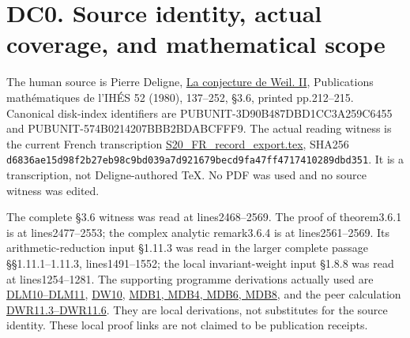 \documentclass[
]{report}
\begin{document}
\section{DC0. Source identity, actual coverage, and mathematical
scope}\label{dc0.-source-identity-actual-coverage-and-mathematical-scope}

The human source is Pierre Deligne,
\href{https://www.numdam.org/item/PMIHES_1980__52__137_0/}{La conjecture
de Weil. II}, Publications mathématiques de l'IHÉS 52 (1980), 137--252,
§3.6, printed pp.212--215. Canonical disk-index identifiers are
PUBUNIT-3D90B487DBD1CC3A259C6455 and PUBUNIT-574B0214207BBB2BDABCFFF9.
The actual reading witness is the current French transcription
\href{https://www.numdam.org/item/PMIHES_1980__52__137_0/}{S20\_FR\_record\_export.tex},
SHA256
\nolinkurl{d6836ae15d98f2b27eb98c9bd039a7d921679becd9fa47ff4717410289dbd351}.
It is a transcription, not Deligne-authored TeX. No PDF was used and no
source witness was edited.

The complete §3.6 witness was read at lines2468--2569. The proof of
theorem3.6.1 is at lines2477--2553; the complex analytic remark3.6.4 is
at lines2561--2569. Its arithmetic-reduction input §1.11.3 was read in
the larger complete passage §§1.11.1--1.11.3, lines1491--1552; the local
invariant-weight input §1.8.8 was read at lines1254--1281. The
supporting programme derivations actually used are
\href{https://github.com/KokunoYumeto/zeta-function-research-reader/blob/main/workbenches/splitzero-tandem/continuations/20260924-cohomology-weight-and-character-lifts/gct-weight-control/proofs/DELIGNE_LOCAL_MONODROMY_RECONSTRUCTION.md}{DLM10--DLM11},
\href{https://github.com/KokunoYumeto/zeta-function-research-reader/blob/main/workbenches/splitzero-tandem/continuations/20260924-cohomology-weight-and-character-lifts/gct-weight-control/proofs/DELIGNE_FUNDAMENTAL_WEIGHT_RECONSTRUCTION.md}{DW10},
\href{https://github.com/KokunoYumeto/zeta-function-research-reader/blob/main/workbenches/splitzero-tandem/continuations/20260924-cohomology-weight-and-character-lifts/gct-weight-control/proofs/DELIGNE_MIXED_DUALITY_AND_BASE_COMPARISON.md}{MDB1,
MDB4, MDB6, MDB8}, and the peer calculation
\href{https://github.com/KokunoYumeto/zeta-function-research-reader/blob/main/workbenches/splitzero-tandem/continuations/20260924-cohomology-weight-and-character-lifts/geometric-positive-quotient/DELIGNE_WEIGHT_CONTROL_RECONSTRUCTION.md}{DWR11.3--DWR11.6}.
They are local derivations, not substitutes for the source identity.
These local proof links are not claimed to be publication receipts.
\end{document}
